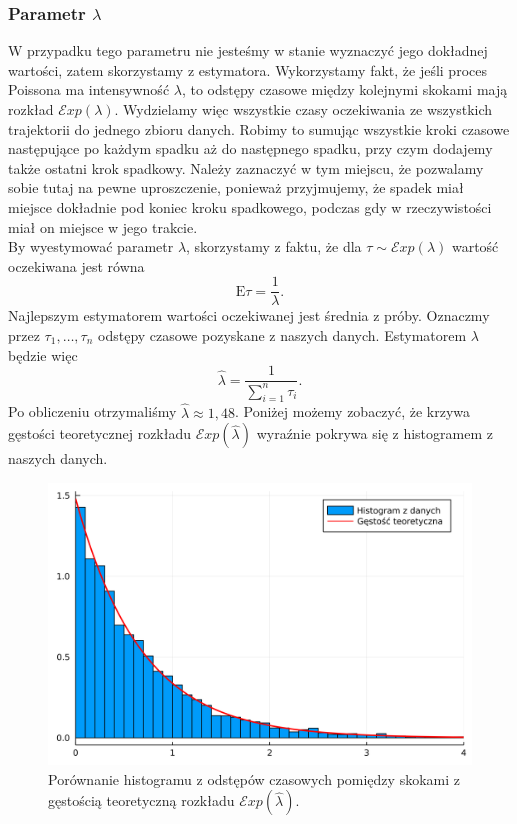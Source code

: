 \documentclass[12pt]{mwart}
\begin{document}
	\subsubsection{Parametr {\boldmath $\lambda$}}
	\noindent W przypadku tego parametru nie jesteśmy w stanie wyznaczyć jego dokładnej wartości, zatem skorzystamy z estymatora. Wykorzystamy fakt, że jeśli proces Poissona ma intensywność $\lambda$, to odstępy czasowe między kolejnymi skokami mają rozkład $\mathcal{E}xp(\lambda)$. Wydzielamy więc wszystkie czasy oczekiwania ze wszystkich trajektorii do jednego zbioru danych. Robimy to sumując wszystkie kroki czasowe następujące po każdym spadku aż do następnego spadku, przy czym dodajemy także ostatni krok spadkowy. Należy zaznaczyć w tym miejscu, że pozwalamy sobie tutaj na pewne uproszczenie, ponieważ przyjmujemy, że spadek miał miejsce dokładnie pod koniec kroku spadkowego, podczas gdy w rzeczywistości miał on miejsce w jego trakcie.\vspace{2mm}\\
	By wyestymować parametr $\lambda$, skorzystamy z faktu, że dla $\tau \sim \mathcal{E}xp(\lambda)$ wartość oczekiwana jest równa
	$$ \mathrm{E}\tau = \frac{1}{\lambda}. $$
	Najlepszym estymatorem wartości oczekiwanej jest średnia z próby. Oznaczmy przez $\tau_1, \dots, \tau_n$ odstępy czasowe pozyskane z naszych danych. Estymatorem $\lambda$ będzie więc
	$$ \widehat{\lambda} = \frac{1}{\sum\limits_{i=1}^n \tau_i}. $$
	Po obliczeniu otrzymaliśmy $\widehat{\lambda} \approx 1,48$. Poniżej możemy zobaczyć, że krzywa gęstości teoretycznej rozkładu $\mathcal{E}xp\left(\widehat{\lambda}\right)$ wyraźnie pokrywa się z histogramem z naszych danych.
	
	\begin{figure}[H]
		\centering
		\includegraphics[scale=0.1]{fig/lambda.png}
		\caption{Porównanie histogramu z odstępów czasowych pomiędzy skokami z gęstością teoretyczną rozkładu $\mathcal{E}xp\left(\widehat{\lambda}\right)$.}
	\end{figure}
	
\end{document}
